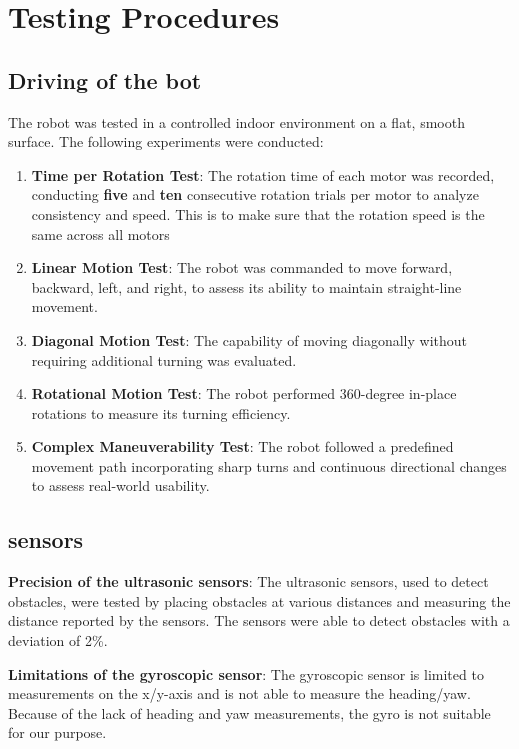 
\section{Testing Procedures}

\subsection{Driving of the bot}
The robot was tested in a controlled indoor environment on a flat, smooth surface. The following experiments were conducted:

\begin{enumerate}
    \item \textbf{Time per Rotation Test}: The rotation time of each motor was recorded, conducting 
        \textbf{five} and \textbf{ten} consecutive rotation trials per motor to analyze consistency and speed. 
        This is to make sure that the rotation speed is the same across all motors
    \item \textbf{Linear Motion Test}: The robot was commanded to move forward, backward, left, and right, to 
        assess its ability to maintain straight-line movement.
    \item \textbf{Diagonal Motion Test}: The capability of moving diagonally without requiring additional turning was evaluated.
    \item \textbf{Rotational Motion Test}: The robot performed 360-degree in-place rotations to measure its turning efficiency.
    \item \textbf{Complex Maneuverability Test}: The robot followed a predefined movement path incorporating sharp turns and 
        continuous directional changes to assess real-world usability.
\end{enumerate}

\subsection{sensors} 
\textbf{Precision of the ultrasonic sensors}:
The ultrasonic sensors, used to detect obstacles, were tested by placing obstacles at various distances and 
measuring the distance reported by the sensors. The sensors were able to detect obstacles
with a deviation of 2\%.


\textbf{Limitations of the gyroscopic sensor}:
The gyroscopic sensor is limited to measurements on the x/y-axis and is not able to measure the heading/yaw.
Because of the lack of heading and yaw measurements, the gyro is not suitable for our purpose.


